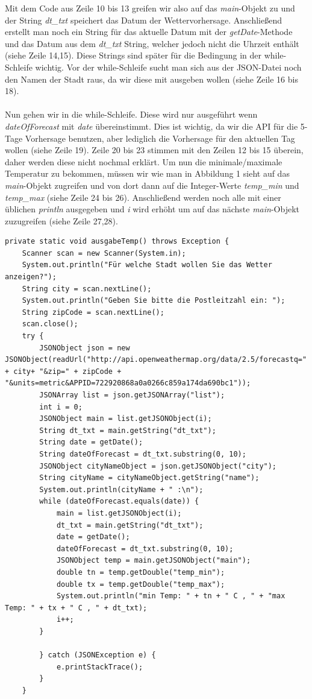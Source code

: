 Mit dem Code aus Zeile 10 bis 13 greifen wir also auf das \textit{main}-Objekt zu und der String \textit{dt\_txt} speichert das Datum der Wettervorhersage. Anschließend erstellt man noch ein String für das aktuelle Datum mit der \textit{getDate}-Methode und das Datum aus dem \textit{dt\_txt} String, welcher jedoch nicht die Uhrzeit enthält (siehe Zeile 14,15). Diese Strings sind später für die Bedingung in der while-Schleife wichtig. Vor der while-Schleife sucht man sich aus der JSON-Datei noch den Namen der Stadt raus, da wir diese mit ausgeben wollen (siehe Zeile 16 bis 18).\cite{[3]} \\
\\
Nun gehen wir in die while-Schleife. Diese wird nur ausgeführt wenn \textit{dateOfForecast} mit \textit{date} übereinstimmt. Dies ist wichtig, da wir die API für die 5-Tage Vorhersage benutzen, aber lediglich die Vorhersage für den aktuellen Tag wollen (siehe Zeile 19). Zeile 20 bis 23 stimmen mit den Zeilen 12 bis 15 überein, daher werden diese nicht nochmal erklärt. Um nun die minimale/maximale Temperatur zu bekommen, müssen wir wie man in Abbildung 1 sieht auf das \textit{main}-Objekt zugreifen und von dort dann auf die Integer-Werte \textit{temp\_min} und  \textit{temp\_max} (siehe Zeile 24 bis 26). Anschließend werden noch alle mit einer üblichen \textit{println} ausgegeben und \textit{i} wird erhöht um auf das nächste \textit{main}-Objekt zuzugreifen (siehe Zeile 27,28).


\begin{lstlisting}[caption={ausgabeTemp}]
private static void ausgabeTemp() throws Exception {
	Scanner scan = new Scanner(System.in);
	System.out.println("Für welche Stadt wollen Sie das Wetter anzeigen?");
	String city = scan.nextLine();
	System.out.println("Geben Sie bitte die Postleitzahl ein: ");
	String zipCode = scan.nextLine();
	scan.close();
	try {
		JSONObject json = new JSONObject(readUrl("http://api.openweathermap.org/data/2.5/forecastq=" + city+ "&zip=" + zipCode + "&units=metric&APPID=722920868a0a0266c859a174da690bc1"));
		JSONArray list = json.getJSONArray("list");
		int i = 0;
		JSONObject main = list.getJSONObject(i);
		String dt_txt = main.getString("dt_txt");
		String date = getDate();
		String dateOfForecast = dt_txt.substring(0, 10);
		JSONObject cityNameObject = json.getJSONObject("city");
		String cityName = cityNameObject.getString("name");
		System.out.println(cityName + " :\n");
		while (dateOfForecast.equals(date)) {
			main = list.getJSONObject(i);
			dt_txt = main.getString("dt_txt");
			date = getDate();
			dateOfForecast = dt_txt.substring(0, 10);
			JSONObject temp = main.getJSONObject("main");
			double tn = temp.getDouble("temp_min");
			double tx = temp.getDouble("temp_max");
			System.out.println("min Temp: " + tn + " C , " + "max Temp: " + tx + " C , " + dt_txt);
			i++;
		}

		} catch (JSONException e) {
			e.printStackTrace();
		}
	}
\end{lstlisting}

